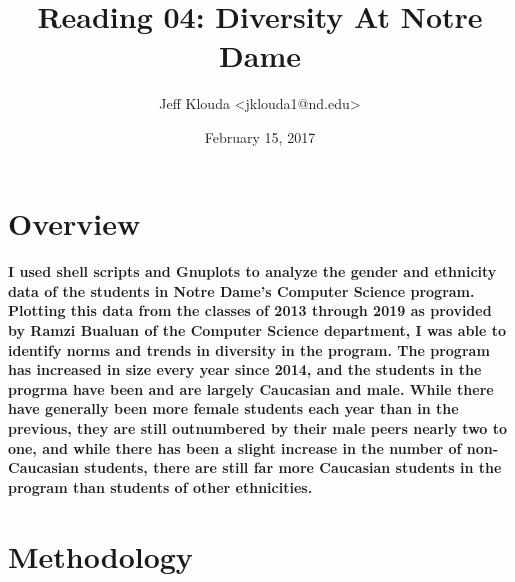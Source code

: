 \documentclass[letterpaper]{article}
\begin{document}

\title{Reading 04: Diversity At Notre Dame}
\date{February 15, 2017}
\author{Jeff Klouda {\textless}jklouda1@nd.edu{\textgreater}}

\maketitle


\section*{Overview}

\paragraph{
I used shell scripts and Gnuplots to analyze the gender and ethnicity data
of the students in Notre Dame's Computer Science program.  Plotting this data
from the classes of 2013 through 2019 as provided by Ramzi Bualuan of the 
Computer Science department, I was able to identify norms and trends in
diversity in the program.  The program has increased in size every year since
2014, and the students in the progrma have been and are largely Caucasian and
male.  While there have generally been more female students each year than in
the previous, they are still outnumbered by their male peers nearly two to
one, and while there has been a slight increase in the number of 
non-Caucasian students, there are still far more Caucasian students in the
program than students of other ethnicities.
}


\section*{Methodology}
\end{document}
